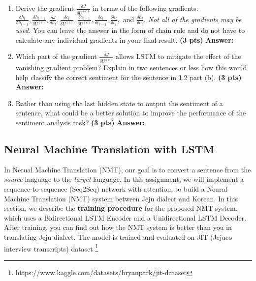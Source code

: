 \documentclass{assignment format}
\newenvironment{answer}{
    {\bf Answer:} \begingroup\color{red}
}{\endgroup}%
\begin{document}
\begin{enumerate}[label=(\alph*)]
    \item Derive the gradient $\frac{\delta J}{\delta U^{(c)}}$ in terms of the following gradients: $\frac{\delta h_{t}}{\delta h_{t-1}}, \frac{\delta h_{t-1}}{\delta U^{(c)}}, \frac{\delta J}{\delta h_{t}}, \frac{\delta c_{t}}{\delta U^{(c)}}, \frac{\delta c_{t-1}}{\delta U^{(c)}}, \frac{\delta c_{t}}{\delta c_{t-1}}, \frac{\delta h_{t}}{\delta c_{t}},$ and $\frac{\delta h_{t}}{\delta o_{t}}$. \textit{Not all of the gradients may be used.} You can leave the answer in the form of chain rule and do not have to calculate any individual gradients in your final result. \textbf{(3 pts)}
    \begin{answer}
    \end{answer}
    \item Which part of the gradient $\frac{\delta J}{\delta U^{(c)}}$ allows LSTM to mitigate the effect of the vanishing gradient problem? Explain in two sentences or less how this would help classify the correct sentiment for the sentence in 1.2 part (b). \textbf{(3 pts)}
    \begin{answer}
    \end{answer}
    \item Rather than using the last hidden state to output the sentiment of a sentence, what could be a better solution to improve the performance of the sentiment analysis task? \textbf{(3 pts)}
    \begin{answer}
    \end{answer}
\end{enumerate}
\subsection{Neural Machine Translation with LSTM}

 In Nerual Machine Translation (NMT), our goal is to convert a sentence from the \textit{source} language to the \textit{target} language. In this assignment, we will implement a sequence-to-sequence (Seq2Seq) network with attention, to build a Neural Machine Translation (NMT) system between Jeju dialect and Korean. In this section, we describe the \textbf{training procedure} for the proposed NMT system, which uses a Bidirectional LSTM Encoder and a Unidirectional LSTM Decoder. After training, you can find out how the NMT system is better than you in translating Jeju dialect. The model is trained and evaluated on JIT (Jejueo interview transcripts) dataset \footnote{https://www.kaggle.com/datasets/bryanpark/jit-dataset}
\end{document}
